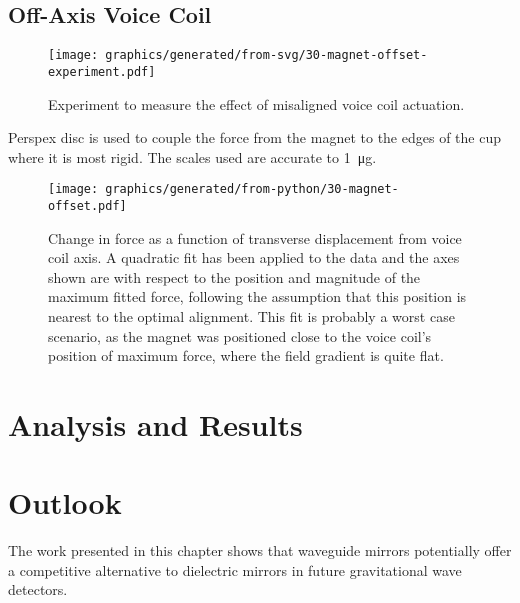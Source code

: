 \subsection{Off-Axis Voice Coil}

\begin{figure}
  \centering
  \texttt{[image: graphics/generated/from-svg/30-magnet-offset-experiment.pdf]}
  \caption{Experiment to measure the effect of misaligned voice coil actuation.}
  \label{fig:misaligned-voice-coil-experiment}
\end{figure}

Perspex disc is used to couple the force from the magnet to the edges of the cup where it is most rigid. The scales used are accurate to \SI{1}{\micro\gram}.

\begin{figure}
  \centering
  \texttt{[image: graphics/generated/from-python/30-magnet-offset.pdf]}
  \caption{Change in force as a function of transverse displacement from voice coil axis. A quadratic fit has been applied to the data and the axes shown are with respect to the position and magnitude of the maximum fitted force, following the assumption that this position is nearest to the optimal alignment. This fit is probably a worst case scenario, as the magnet was positioned close to the voice coil's position of maximum force, where the field gradient is quite flat. }
  \label{fig:misaligned-voice-coil-results}
\end{figure}


\section{Analysis and Results}

\section{Outlook}

The work presented in this chapter shows that waveguide mirrors potentially offer a competitive alternative to dielectric mirrors in future gravitational wave detectors.

